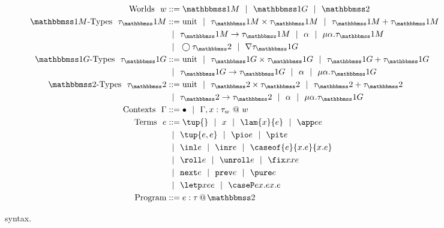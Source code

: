 
\begin{figure}
\begin{abstrsyn}
\[\begin{aligned}
\text{Worlds}\ \ 
\world &::= \bbonem \gbar \bbonep \gbar \bbtwo  \\
%
\text{\bbonem-Types}\ \ 
\type_\bbonem &::= \text{unit}
 \gbar \type_\bbonem \times \type_\bbonem
 \gbar \type_\bbonem + \type_\bbonem \\
&\gbar \type_\bbonem \to \type_\bbonem
 \gbar \alpha \gbar \mu \alpha.\tau_\bbonem \\
&\gbar \fut \type_\bbtwo
 \gbar \curr \type_\bbonep \\
%
\text{\bbonep-Types}\ \ 
\type_\bbonep &::= \text{unit}
 \gbar \type_\bbonep \times \type_\bbonep
 \gbar \type_\bbonep + \type_\bbonep \\
&\gbar \type_\bbonep \to \type_\bbonep
 \gbar \alpha \gbar \mu \alpha.\tau_\bbonep \\
%
\text{\bbtwo-Types}\ \ 
\type_\bbtwo &::= \text{unit}
 \gbar \type_\bbtwo \times \type_\bbtwo
 \gbar \type_\bbtwo + \type_\bbtwo \\
&\gbar \type_\bbtwo \to \type_\bbtwo
 \gbar \alpha \gbar \mu \alpha.\tau_\bbonep \\
%
%
\text{Contexts}\ \ 
\context &::=\emptyC
 \gbar \context, x:\tau_w~@~w \\
%
\text{Terms}\ \ 
\expr &::= \tup{}\gbar\var%
 \gbar \lam {\var}{\expr} 
 \gbar \app \expr \expr \\
&\gbar \tup{\expr, \expr} 
 \gbar \pio \expr 
 \gbar \pit \expr \\
&\gbar \inl \expr 
 \gbar \inr \expr
 \gbar \caseof {\expr}{\var.\expr}{\var.\expr}
\\ %
&\gbar \roll e
 \gbar \unroll e
 \gbar \fix \var \var \expr\\
&\gbar \next \expr 
 \gbar \prev \expr
 \gbar \pure \expr \\
&\gbar \letp \var \expr \expr
 \gbar \caseP \expr {\var.\expr} {\var.\expr} \\
\text{Program} &::= \coltwo e \tau \\
\end{aligned}\]
\end{abstrsyn}
\caption{\lang~syntax.}
\label{fig:grammar}
\end{figure}
